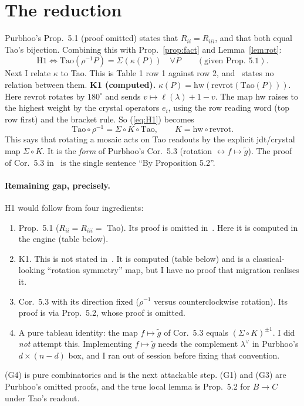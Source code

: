 \documentclass[11pt]{article}
\theoremstyle{definition}
\begin{document}
\section{The reduction}
Purbhoo's Prop.~5.1 (proof omitted) states that $R_{ii}=R_{iii}$, and that both equal Tao's bijection. Combining this with
Prop.~\ref{prop:fact} and Lemma~\ref{lem:rot}:
\begin{equation}\label{eq:H1}
\text{H1}\iff \mathrm{Tao}(\rho^{-1}P)=\Sigma(\kappa(P))\quad\forall P \qquad(\text{given Prop.~5.1}).
\end{equation}
Next I relate $\kappa$ to Tao. This is Table 1 row 1 against row 2, and~\cite{P} states no relation between them.
\textbf{K1 (computed).} $\kappa(P)=\mathrm{hw}(\mathrm{revrot}(\mathrm{Tao}(P)))$. Here revrot rotates by $180^\circ$ and
sends $v\mapsto\ell(\lambda)+1-v$. The map hw raises to the highest weight by the crystal operators $e_i$, using the
row reading word (top row first) and the bracket rule. So (\ref{eq:H1}) becomes
\[
\mathrm{Tao}\circ\rho^{-1}=\Sigma\circ K\circ\mathrm{Tao},\qquad K=\mathrm{hw}\circ\mathrm{revrot}.
\]
This says that rotating a mosaic acts on Tao readouts by the explicit jdt/crystal map $\Sigma\circ K$. It is the
\emph{form} of Purbhoo's Cor.~5.3 (rotation $\leftrightarrow f\mapsto\tilde g$). The proof of Cor.~5.3 in~\cite{P} is
the single sentence ``By Proposition 5.2''.

\paragraph{Remaining gap, precisely.} H1 would follow from four ingredients:
\begin{enumerate}
\item[(G1)] Prop.~5.1 ($R_{ii}=R_{iii}=$ Tao). Its proof is omitted in~\cite{P}. Here it is computed in the engine (table below).
\item[(G2)] K1. This is not stated in~\cite{P}. It is computed (table below) and is a classical-looking ``rotation symmetry'' map,
but I have no proof that migration realises it.
\item[(G3)] Cor.~5.3 with its direction fixed ($\rho^{-1}$ versus counterclockwise rotation). Its proof is via Prop.~5.2,
whose proof is omitted.
\item[(G4)] A pure tableau identity: the map $f\mapsto\tilde g$ of Cor.~5.3 equals $(\Sigma\circ K)^{\pm1}$. I did
\emph{not} attempt this. Implementing $f\mapsto\tilde g$ needs the complement $\lambda^\vee$ in Purbhoo's
$d\times(n-d)$ box, and I ran out of session before fixing that convention.
\end{enumerate}
(G4) is pure combinatorics and is the next attackable step. (G1) and (G3) are Purbhoo's omitted proofs, and
the true local lemma is Prop.~5.2 for $B\to C$ under Tao's readout.
\end{document}
